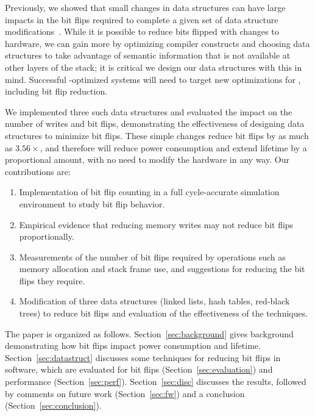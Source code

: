 Previously, we showed that small changes in data
structures can have large impacts in the bit flips required to
complete a given set of data structure modifications~\cite{bittman:nvmsa18}.
While it is possible to
reduce bits flipped with changes to hardware, we can gain more
by optimizing compiler constructs and choosing data structures to take advantage
of semantic information that is not available at other layers of the stack;
it is critical we design our data structures with this in mind. Successful \NVM-optimized
systems will need to target new optimizations for \NVM, including bit flip reduction.

We implemented three such
data structures and evaluated the impact on the number of writes and bit flips,
demonstrating the effectiveness of designing data structures to minimize bit
flips.
These simple changes reduce bit flips by as much as $3.56\times$, and therefore will reduce power
consumption and extend lifetime by a proportional amount,
with no need to modify the hardware in any way.
Our contributions are:
\begin{enumerate}
	\item Implementation of bit flip counting in a full cycle-accurate simulation
	      environment to study bit
	      flip behavior.%
	\item Empirical evidence that reducing memory writes may not reduce bit flips
	      proportionally.
	\item Measurements of the number of bit flips required by operations such as
	      memory allocation and stack frame use, and suggestions for reducing the
	      bit flips they require.
	\item Modification of three data structures (linked lists, hash tables, red-black
	      trees) to reduce bit flips and evaluation of the effectiveness of the techniques.
\end{enumerate}

The paper is organized as follows. Section~\ref{sec:background} gives
background demonstrating how bit flips impact power consumption and
\NVM lifetime. Section~\ref{sec:datastruct} discusses some techniques for
reducing bit flips in software, which are evaluated for bit flips
(Section~\ref{sec:evaluation}) and performance (Section~\ref{sec:perf}).
Section~\ref{sec:disc} discusses the results, followed by comments on
future work (Section~\ref{sec:fw}) and a conclusion
(Section~\ref{sec:conclusion}).

